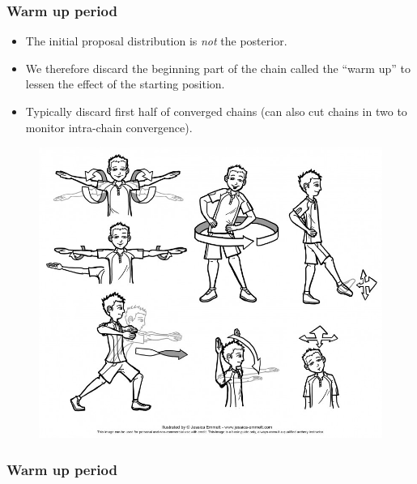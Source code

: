 \documentclass[handout]{beamer}
\begin{document}
\begin{frame}
\frametitle{Warm up period}
\begin{itemize}
\item<2-> The initial proposal distribution is \textit{not} the posterior.
\item<3-> We therefore discard the beginning part of the chain called the ``warm up'' to lessen the effect of the starting position. 
\item<4-> Typically discard first half of converged chains (can also cut chains in two to monitor intra-chain convergence).
\end{itemize}

\begin{figure}[ht]
\centerline{\includegraphics[width=1.0\textwidth]{animations_figures/warmup.jpg}}
\end{figure}

\end{frame}

\begin{frame}
\frametitle{Warm up period}


\end{frame}
\end{document}
